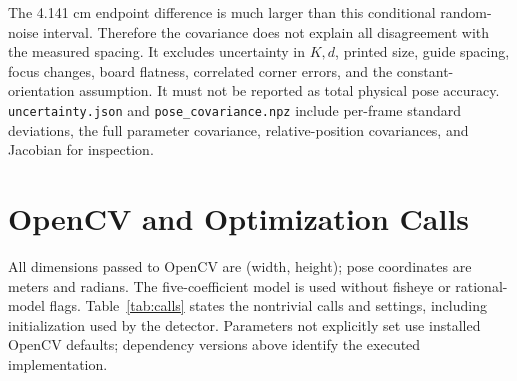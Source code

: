 \documentclass[conference,letterpaper]{IEEEtran}
\newcommand{\code}[1]{\nolinkurl{#1}}
\begin{document}
The 4.141 cm endpoint difference is much larger than this conditional random-noise interval. Therefore the covariance does not explain all disagreement with the measured spacing. It excludes uncertainty in $K,d$, printed size, guide spacing, focus changes, board flatness, correlated corner errors, and the constant-orientation assumption. It must not be reported as total physical pose accuracy. \code{uncertainty.json} and \code{pose_covariance.npz} include per-frame standard deviations, the full parameter covariance, relative-position covariances, and Jacobian for inspection.

\appendices
\section{OpenCV and Optimization Calls}
All dimensions passed to OpenCV are (width, height); pose coordinates are meters and radians. The five-coefficient model is used without fisheye or rational-model flags. Table~\ref{tab:calls} states the nontrivial calls and settings, including initialization used by the detector. Parameters not explicitly set use installed OpenCV defaults; dependency versions above identify the executed implementation.
\end{document}

